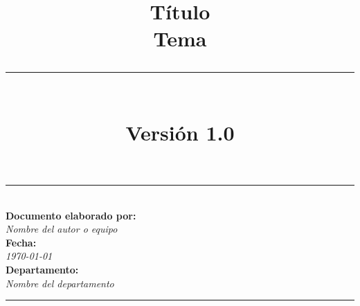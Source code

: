 \documentclass[a4paper,12pt]{book}
\title{
    \vspace*{3cm}
    {\Huge\textbf{Título}} \\
    \vspace{0.5cm}
    {\Large\textbf{Tema}} \\
    \vspace{1.5cm}
    \rule{\textwidth}{2pt} \\
    \vspace{1.5cm}
    {\large Versión 1.0}
}
\author{}
\date{}
\begin{document}
\begin{titlepage}
    \maketitle
    \vfill
    \begin{center}
        \rule{\textwidth}{1pt} \\
        \vspace{0.5cm}
        \textbf{\large Documento elaborado por:} \\
        \vspace{0.2cm}
        \textit{Nombre del autor o equipo} \\
        \vspace{0.5cm}
        \textbf{\large Fecha:} \\
        \vspace{0.2cm}
        \textit{\today} \\
        \vspace{0.5cm}
        \textbf{\large Departamento:} \\
        \vspace{0.2cm}
        \textit{Nombre del departamento} \\
        \vspace{0.5cm}
        \rule{\textwidth}{1pt}
    \end{center}
\end{titlepage}

\maketitle

\tableofcontents

\newpage





\end{document}
